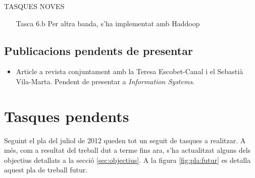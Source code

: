 TASQUES NOVES
\todo{}

\begin{enumerate}

\item[Tasca 6.b] Per altra banda, s'ha implementat amb Haddoop


\end{enumerate}






\subsection{Publicacions pendents de presentar}
\todo{}

\begin{itemize}

\item Article a revista conjuntament amb la Teresa Escobet-Canal i el
  Sebastià Vila-Marta. Pendent de presentar a \emph{Information Systems}.

\end{itemize}




\section{Tasques pendents}

Seguint el pla del juliol de 2012 queden tot un seguit de tasques a
realitzar. A més, com a resultat del treball dut a terme fins ara, s'ha
actualitzat alguns dels objectius detallats a la secció
\ref{sec:objectius}.  A la figura \ref{fig:pla:futur} es detalla aquest
pla de treball futur.

